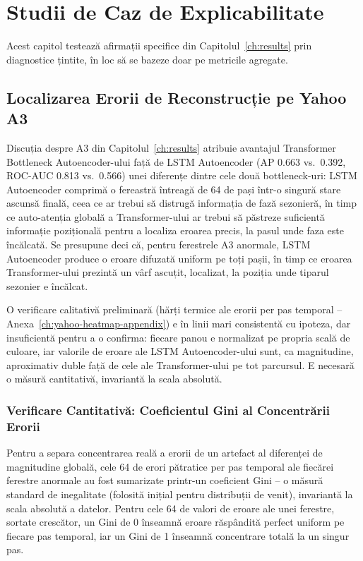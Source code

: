 \chapter{Studii de Caz de Explicabilitate}
\label{ch:explainability}

Acest capitol testează afirmații specifice din Capitolul~\ref{ch:results} prin diagnostice țintite, în loc să se bazeze doar pe metricile agregate.

\section{Localizarea Erorii de Reconstrucție pe Yahoo A3}
\label{sec:explain-yahoo}

Discuția despre A3 din Capitolul~\ref{ch:results} atribuie avantajul Transformer Bottleneck Autoencoder-ului față de LSTM Autoencoder (AP 0.663 vs.\ 0.392, ROC-AUC 0.813 vs.\ 0.566) unei diferențe dintre cele două bottleneck-uri: LSTM Autoencoder comprimă o fereastră întreagă de 64 de pași într-o singură stare ascunsă finală, ceea ce ar trebui să distrugă informația de fază sezonieră, în timp ce auto-atenția globală a Transformer-ului ar trebui să păstreze suficientă informație pozițională pentru a localiza eroarea precis, la pasul unde faza este încălcată. Se presupune deci că, pentru ferestrele A3 anormale, LSTM Autoencoder produce o eroare difuzată uniform pe toți pașii, în timp ce eroarea Transformer-ului prezintă un vârf ascuțit, localizat, la poziția unde tiparul sezonier e încălcat.

O verificare calitativă preliminară (hărți termice ale erorii per pas temporal -- Anexa~\ref{ch:yahoo-heatmap-appendix}) e în linii mari consistentă cu ipoteza, dar insuficientă pentru a o confirma: fiecare panou e normalizat pe propria scală de culoare, iar valorile de eroare ale LSTM Autoencoder-ului sunt, ca magnitudine, aproximativ duble față de cele ale Transformer-ului pe tot parcursul. E necesară o măsură cantitativă, invariantă la scala absolută.

\subsection{Verificare Cantitativă: Coeficientul Gini al Concentrării Erorii}

Pentru a separa concentrarea reală a erorii de un artefact al diferenței de magnitudine globală, cele 64 de erori pătratice per pas temporal ale fiecărei ferestre anormale au fost sumarizate printr-un coeficient Gini -- o măsură standard de inegalitate (folosită inițial pentru distribuții de venit), invariantă la scala absolută a datelor. Pentru cele 64 de valori de eroare ale unei ferestre, sortate crescător, un Gini de 0 înseamnă eroare răspândită perfect uniform pe fiecare pas temporal, iar un Gini de 1 înseamnă concentrare totală la un singur pas.

